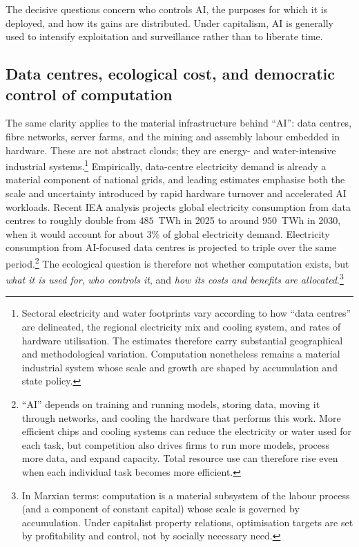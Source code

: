 The decisive questions concern who controls AI, the purposes for which it is
deployed, and how its gains are distributed. Under capitalism, AI is generally
used to intensify exploitation and surveillance rather than to liberate time.

\subsection{Data centres, ecological cost, and democratic control of computation}
\label{sec:data-centres-ecology-control}

The same clarity applies to the material infrastructure behind ``AI'': data centres, fibre networks,
server farms, and the mining and assembly labour embedded in hardware. These are not abstract clouds;
they are energy- and water-intensive industrial systems.\cite{IEAEnergyAI2026}\footnote{Sectoral electricity and water footprints vary according to how
``data centres'' are delineated, the regional electricity mix and cooling
system, and rates of hardware utilisation. The estimates therefore carry
substantial geographical and methodological variation. Computation
nonetheless remains a material industrial system whose scale and growth are
shaped by accumulation and state policy.}
Empirically, data-centre electricity demand is already a material component of national grids,
and leading estimates emphasise both the scale and uncertainty introduced by rapid hardware
turnover and accelerated AI workloads.\cite{IEAEnergyAI2026,Masanet2020,LiEtAl2023Thirsty}
Recent IEA analysis projects global electricity consumption from data centres
to roughly double from \(485\)~TWh in 2025 to around \(950\)~TWh in 2030,
when it would account for about \(3\%\) of global electricity demand.
Electricity consumption from AI-focused data centres is projected to triple
over the same period.\cite{IEAEnergyAI2026}\footnote{``AI'' depends on training and running models, storing data, moving it through networks, and cooling the hardware that performs this work. More efficient chips and cooling systems can reduce the electricity or water used for each task, but competition also drives firms to run more models, process more data, and expand capacity. Total resource use can therefore rise even when each individual task becomes more efficient.}
The ecological question is therefore not
whether computation exists, but \emph{what it is used for}, \emph{who controls it}, and \emph{how its costs
and benefits are allocated}.\footnote{In Marxian terms: computation is a material subsystem of the labour process (and a component of constant capital) whose scale is governed by accumulation. Under capitalist property relations, optimisation targets are set by profitability and control, not by socially necessary need.}


